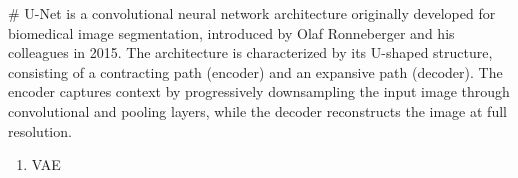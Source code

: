 #
U-Net is a convolutional neural network architecture originally developed for biomedical image segmentation, introduced by Olaf Ronneberger and his colleagues in 2015. The architecture is characterized by its U-shaped structure, consisting of a contracting path (encoder) and an expansive path (decoder). The encoder captures context by progressively downsampling the input image through convolutional and pooling layers, while the decoder reconstructs the image at full resolution.




\begin{enumerate}
    \item VAE
    
\end{enumerate}